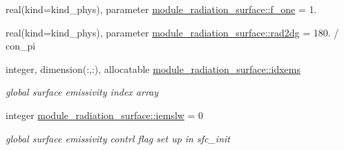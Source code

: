 \begin{DoxyCompactItemize}
\item 
real(kind=kind\+\_\+phys), parameter \hyperlink{group__module__radiation__surface_ga91cec823f595387c92d659d89f307f42}{module\+\_\+radiation\+\_\+surface\+::f\+\_\+one} = 1.
\item 
real(kind=kind\+\_\+phys), parameter \hyperlink{group__module__radiation__surface_gab879c7cf4e0774089a626e54226e4c1b}{module\+\_\+radiation\+\_\+surface\+::rad2dg} = 180. / con\+\_\+pi
\item 
integer, dimension(\+:,\+:), allocatable \hyperlink{group__module__radiation__surface_gac33f1f3441f8336d7eb7e15cba26caf7}{module\+\_\+radiation\+\_\+surface\+::idxems}
\begin{DoxyCompactList}\small\item\em global surface emissivity index array \end{DoxyCompactList}\item 
integer \hyperlink{group__module__radiation__surface_ga3ceebb99dbffcb70a14cfcaa7b029abc}{module\+\_\+radiation\+\_\+surface\+::iemslw} = 0
\begin{DoxyCompactList}\small\item\em global surface emissivity contrl flag set up in \textquotesingle{}sfc\+\_\+init\textquotesingle{} \end{DoxyCompactList}\end{DoxyCompactItemize}

